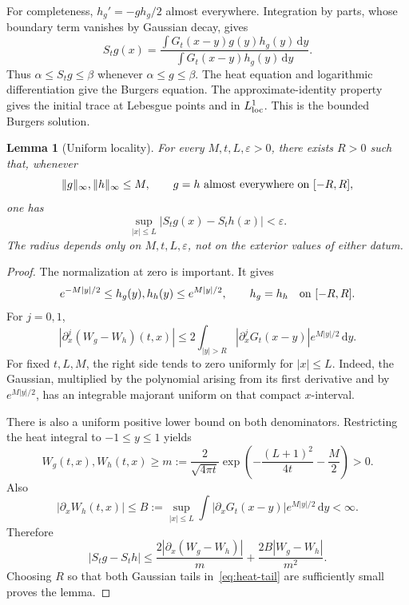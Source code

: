\documentclass[11pt,a4paper]{article}
\numberwithin{equation}{section}
\newtheorem{lemma}[theorem]{Lemma}
\theoremstyle{remark}\newtheorem{remark}[theorem]{Remark}
\newcommand{\dd}{\,\mathrm d}
\begin{document}
For completeness, $h_g'=-g h_g/2$ almost everywhere. Integration by parts, whose boundary term vanishes by Gaussian decay, gives
\begin{equation}\label{eq:average}
 S_tg(x)=\frac{\int G_t(x-y)g(y)h_g(y)\dd y}
 {\int G_t(x-y)h_g(y)\dd y}.
\end{equation}
Thus $\alpha\leq S_tg\leq\beta$ whenever $\alpha\leq g\leq\beta$. The heat equation and logarithmic differentiation give the Burgers equation. The approximate-identity property gives the initial trace at Lebesgue points and in $L^1_{\rm loc}$. This is the bounded Burgers solution.

\begin{lemma}[Uniform locality]\label{lem:locality}
For every $M,t,L,\varepsilon>0$, there exists $R>0$ such that, whenever
\[
 \|g\|_\infty,\|h\|_\infty\leq M,
 \qquad g=h\ \hbox{almost everywhere on }[-R,R],
\]
one has
\[
 \sup_{|x|\leq L}|S_tg(x)-S_th(x)|<\varepsilon.
\]
The radius depends only on $M,t,L,\varepsilon$, not on the exterior values of either datum.
\end{lemma}
\begin{proof}
The normalization at zero is important. It gives
\[
 e^{-M|y|/2}\leq h_g(y),h_h(y)\leq e^{M|y|/2},
 \qquad h_g=h_h\quad\hbox{on }[-R,R].
\]
For $j=0,1$,
\begin{equation}\label{eq:heat-tail}
 |\partial_x^j(W_g-W_h)(t,x)|
 \leq 2\int_{|y|>R}|\partial_x^jG_t(x-y)|e^{M|y|/2}\dd y.
\end{equation}
For fixed $t,L,M$, the right side tends to zero uniformly for $|x|\leq L$. Indeed, the Gaussian, multiplied by the polynomial arising from its first derivative and by $e^{M|y|/2}$, has an integrable majorant uniform on that compact $x$-interval.

There is also a uniform positive lower bound on both denominators. Restricting the heat integral to $-1\leq y\leq1$ yields
\begin{equation}\label{eq:denom}
 W_g(t,x),W_h(t,x)\geq
 m:=\frac{2}{\sqrt{4\pi t}}
 \exp\left(-\frac{(L+1)^2}{4t}-\frac M2\right)>0.
\end{equation}
Also
\[
 |\partial_xW_h(t,x)|\leq
 B:=\sup_{|x|\leq L}\int|\partial_xG_t(x-y)|e^{M|y|/2}\dd y<\infty.
\]
Therefore
\[
 |S_tg-S_th|
 \leq \frac{2|\partial_x(W_g-W_h)|}{m}
      +\frac{2B|W_g-W_h|}{m^2}.
\]
Choosing $R$ so that both Gaussian tails in~\eqref{eq:heat-tail} are sufficiently small proves the lemma.
\end{proof}
\end{document}
